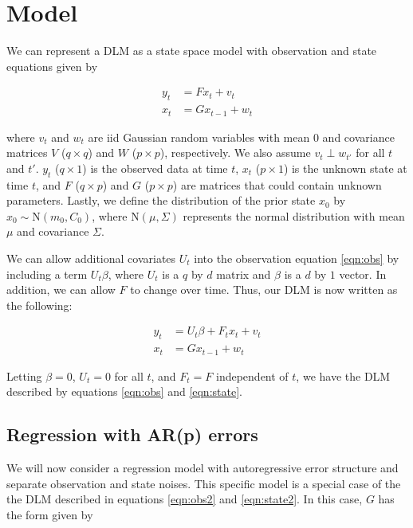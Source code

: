 \documentclass{article}
\begin{document}
\section{Model} \label{sec:model}

We can represent a DLM as a state space model with observation and state equations given by

\begin{align}
y_t &= Fx_t + v_t \label{eqn:obs} \\
x_t &= Gx_{t-1} + w_t \label{eqn:state}
\end{align}

\noindent where $v_t$ and $w_t$ are iid Gaussian random variables with mean 0 and covariance matrices $V$ ($q \times q$) and $W$ ($p \times p$), respectively. We also assume $v_t \perp w_{t'}$ for all $t$ and $t'$. $y_t$ ($q \times 1$) is the observed data at time $t$, $x_t$ ($p \times 1$) is the unknown state at time $t$, and $F$ ($q \times p$) and $G$ ($p \times p$) are matrices that could contain unknown parameters. Lastly, we define the distribution of the prior state $x_0$ by $x_0 \sim \mbox{N}(m_0, C_0)$, where $\mbox{N}(\mu, \Sigma)$ represents the normal distribution with mean $\mu$ and covariance $\Sigma$.

We can allow additional covariates $U_t$ into the observation equation \eqref{eqn:obs} by including a term $U_t \beta$, where $U_t$ is a $q$ by $d$ matrix and $\beta$ is a $d$ by $1$ vector. In addition, we can allow $F$ to change over time. Thus, our DLM is now written as the following:

\begin{align}
y_t &= U_t\beta + F_tx_t + v_t \label{eqn:obs2} \\
x_t &= Gx_{t-1} + w_t \label{eqn:state2}
\end{align}

\noindent Letting $\beta = 0$, $U_t = 0$ for all $t$, and $F_t = F$ independent of $t$, we have the DLM described by equations \eqref{eqn:obs} and \eqref{eqn:state}.

\subsection{Regression with AR(p) errors}

We will now consider a regression model with autoregressive error structure and separate observation and state noises. This specific model is a special case of the the DLM described in equations \eqref{eqn:obs2} and \eqref{eqn:state2}. In this case, $G$ has the form given by
\end{document}

